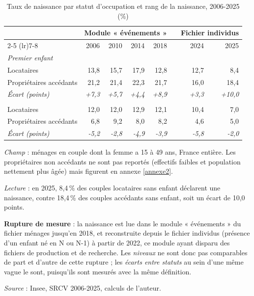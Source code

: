 \documentclass[12pt,a4paper]{article}
\begin{document}
\bigskip

\begin{table}[htbp]
	\centering
	\footnotesize
	\setlength{\tabcolsep}{5pt}
	\begin{threeparttable}
		\caption{Taux de naissance par statut d'occupation et rang de la naissance, 2006-2025 (\%)}
		\label{tab:naiss_statut_rang}
		\begin{tabular}{lrrrrcrr}
			\toprule
			& \multicolumn{4}{c}{Module « événements »} & & \multicolumn{2}{c}{Fichier individus} \\
			\cmidrule(lr){2-5} \cmidrule(lr){7-8}
			& 2006 & 2010 & 2014 & 2018 & & 2024 & 2025 \\
			\midrule
			\multicolumn{8}{l}{\textit{Premier enfant}} \\
			Locataires              & 13,8 & 15,7 & 17,9 & 12,8 & & 12,7 & 8,4 \\
			Propriétaires accédants & 21,2 & 21,4 & 22,3 & 21,7 & & 16,0 & 18,4 \\
			\textit{Écart (points)} & \textit{+7,3} & \textit{+5,7} & \textit{+4,4} & \textit{+8,9} & & \textit{+3,3} & \textit{+10,0} \\
			\addlinespace
			\multicolumn{8}{l}{\textit{Rang 2 et plus}} \\
			Locataires              & 12,0 & 12,0 & 12,9 & 12,1 & & 10,4 & 7,0 \\
			Propriétaires accédants & 6,8 & 9,2 & 8,0 & 8,2 & & 4,6 & 5,0 \\
			\textit{Écart (points)} & \textit{-5,2} & \textit{-2,8} & \textit{-4,9} & \textit{-3,9} & & \textit{-5,8} & \textit{-2,0} \\
			\bottomrule
		\end{tabular}
		\begin{tablenotes}[flushleft]\scriptsize
			\item \textit{Champ} : ménages en couple dont la femme a 15 à 49 ans, France entière.
			Les propriétaires non accédants ne sont pas reportés (effectifs faibles et population
			nettement plus âgée) mais figurent en annexe \ref{annexe2}.
			\item \textit{Lecture} : en 2025, 8,4\,\% des couples locataires sans enfant déclarent
			une naissance, contre 18,4\,\% des couples accédants sans enfant, soit un écart de
			10,0 points.
			\item \textbf{Rupture de mesure} : la naissance est lue dans le module « événements »
			du fichier ménages jusqu'en 2018, et reconstruite depuis le fichier individus
			(présence d'un enfant né en N ou N-1) à partir de 2022, ce module ayant disparu des
			fichiers de production et de recherche. Les \textit{niveaux} ne sont donc pas
			comparables de part et d'autre de cette rupture ; les \textit{écarts entre statuts}
			au sein d'une même vague le sont, puisqu'ils sont mesurés avec la même définition.
			\item \textit{Source} : Insee, SRCV 2006-2025, calculs de l'auteur.
		\end{tablenotes}
	\end{threeparttable}
\end{table}
\end{document}
